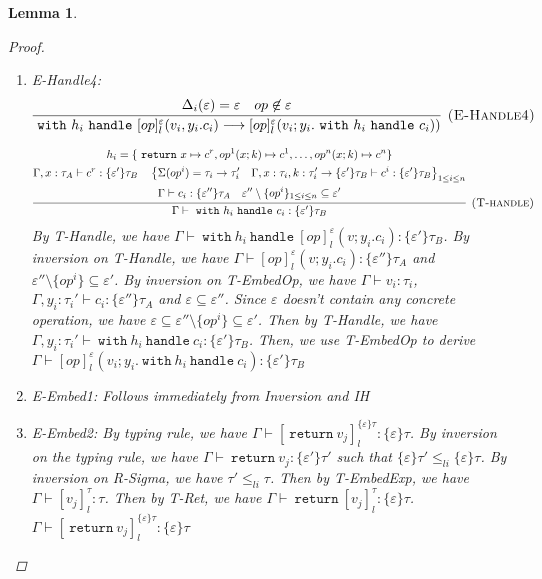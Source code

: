\documentclass{article}
\newtheorem{lemma}[theorem]{Lemma}
\theoremstyle{definition}
\newcommand{\m}[1]{\ \texttt{#1}\ }
\begin{document}
\begin{lemma}
\begin{proof}
\begin{enumerate}
\item E-Handle4:
$$
\infer[\textsc{(E-Handle4)}]
  {\m{with} h_i \m{handle} [op]^\varepsilon_l(v_i, y_i.c_i) \longrightarrow [op]^\varepsilon_l(v_i; y_i. \m{with} h_i \m{handle} c_i))}
  {\Delta_i(\varepsilon) = \varepsilon & op \not \in \varepsilon} 
$$

$$
\infer[\textsc{(T-handle)}]
  {\Gamma\vdash \m{with} h_i \m{handle} c_i: \{\varepsilon'\} \tau_B}
  {\begin{gathered}
  h_i = \{\m{return} x \mapsto c^r, op^1(x;k) \mapsto c^1, \dots, op^n(x;k) \mapsto c^n \}\\
  \Gamma, x: \tau_A \vdash c^r : \{\varepsilon'\}\tau_B \quad
  \left\{ \Sigma(op^i) = \tau_i \rightarrow \tau_i'  \quad \Gamma, x:\tau_i, k:\tau_i' \rightarrow \{\varepsilon'\}\tau_B \vdash c^i: \{\varepsilon'\}\tau_B    \right\}_{1 \leq i \leq n} \\
  \Gamma \vdash c_i : \{\varepsilon''\}\tau_A \quad \varepsilon'' \setminus \{op^i\}_{1 \leq i \leq n} \subseteq \varepsilon'
  \end{gathered}}
$$
By T-Handle, we have $\Gamma \vdash \m{with} h_i \m{handle} [op]^\varepsilon_l(v;y_i.c_i) :  \{\varepsilon'\}\tau_B$. By inversion on T-Handle, we have $\Gamma \vdash [op]^\varepsilon_l(v;y_i.c_i): \{\varepsilon''\}\tau_A$ and $\varepsilon'' \setminus \{op^i\} \subseteq \varepsilon'$. By inversion on T-EmbedOp, we have $\Gamma \vdash v_i: \tau_i$, $\Gamma, y_i:\tau_i' \vdash c_i : \{\varepsilon''\}\tau_A$ and $\varepsilon \subseteq \varepsilon''$. Since $\varepsilon$ doesn't contain any concrete operation, we have $\varepsilon \subseteq  \varepsilon'' \setminus \{op^i\} \subseteq \varepsilon' $. Then by T-Handle, we have $\Gamma, y_i: \tau_i' \vdash \m{with} h_i \m{handle} c_i : \{\varepsilon'\}\tau_B$. Then, we use T-EmbedOp to derive $\Gamma \vdash [op]^\varepsilon_l(v_i; y_i. \m{with} h_i \m{handle} c_i) : \{\varepsilon'\}\tau_B$


\item E-Embed1: Follows immediately from Inversion and IH
\item E-Embed2: By typing rule, we have $\Gamma \vdash [\m{return} v_j]^{\{\varepsilon\}\tau}_l :\{\varepsilon\}\tau$. By inversion on the typing rule, we have $\Gamma \vdash \m{return} v_j : \{\varepsilon'\}\tau'$ such that $\{\varepsilon\}\tau' \leq_{li} \{\varepsilon\}\tau$. By inversion on R-Sigma, we have $\tau' \leq_{li} \tau$. Then by T-EmbedExp, we have $\Gamma \vdash [v_j]^\tau_l : \tau$. Then by T-Ret, we have $\Gamma \vdash \m{return}  [v_j]^\tau_l : \{\varepsilon\}\tau$. $\Gamma \vdash [\m{return} v_j]^{\{\varepsilon\}\tau}_l :\{\varepsilon\}\tau$


\end{enumerate}
\end{proof}
\end{lemma}
\end{document}
